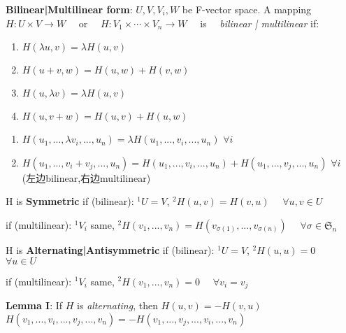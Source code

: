 \documentclass[9pt]{article}
\begin{document}
\vspace{3pt}
\textbf{Bilinear|Multilinear form}: {\small $U,V,V_i,W$ be F-vector space. \quad A mapping \ \ $H: U\times V\to W$ \ \ or \ \ $H:V_1\times \cdots\times V_n\to W$ \ \ is \ \ \textit{bilinear | multilinear} if:}

\vspace{2pt}
\noindent
\begin{minipage}{0.4\linewidth}
    \begin{enumerate}[itemsep=-2pt, topsep=-2pt]
        \item $H(\lambda u,v)=\lambda H(u,v)$
        \item $H(u+v,w)=H(u,w)+H(v,w)$
        \item $H(u,\lambda v)=\lambda H(u,v)$
        \item $H(u,v+w)=H(u,v)+H(u,w)$
    \end{enumerate}
\end{minipage}%
\hfill
\begin{minipage}{0.6\linewidth}
    \begin{enumerate}[itemsep=-2pt, topsep=-2pt]
        \item $H(u_1,...,\lambda v_i,...,u_n)=\lambda H(u_1,...,v_i,...,u_n)$ \quad $\forall i$
        \item $H(u_1,...,v_i+v_j,...,u_n)=H(u_1,...,v_i,...,u_n)+H(u_1,...,v_j,...,u_n)$ \quad $\forall i$ \\
        {\scriptsize (左边bilinear,右边multilinear)}
    \end{enumerate}
\end{minipage}

\vspace{3pt}
\quad H is \textbf{Symmetric} if (bilinear): $^1U=V$, \quad $^2H(u,v)=H(v,u)$ \ \ $\forall u,v\in U$

\hspace{78pt} if (multilinear): $^1V_i$ same, \quad $^2H(v_1,...,v_n)=H(v_{\sigma(1)},...,v_{\sigma(n)})$ \ \ $\forall \sigma\in\mathfrak{S}_n$

\quad H is \textbf{Alternating|Antisymmetric} if (bilinear): $^1U=V$, \quad $^2H(u,u)=0$ \ \ $\forall u\in U$

\hspace{153pt} if (multilinear): $^1V_i$ same, \quad $^2H(v_1,...,v_n)=0$ \ \ $\forall v_i=v_j$ 

\quad \textbf{Lemma I}: If $H$ is \textit{alternating}, then \quad $H(u,v)=-H(v,u)$ \qquad $H(v_1,...,v_i,...,v_j,...,v_n)=-H(v_1,...,v_j,...,v_i,...,v_n)$ 
\end{document}
